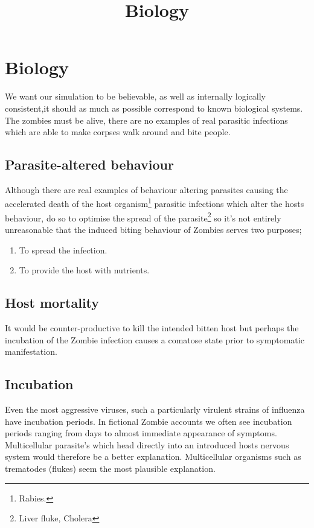 \pagestyle{empty}

\title{Biology}

\section{Biology}
We want our simulation to be believable, as well as internally logically consistent,it should as much as possible correspond to known biological systems. The zombies must be alive, there are no examples of real parasitic infections which are able to make corpses walk around and bite people.

\subsection{Parasite-altered behaviour}
Although there are real examples of behaviour altering parasites causing the accelerated death of the host organism\footnote{Rabies.} parasitic infections which alter the hosts behaviour, do so to optimise the spread of the parasite\footnote{Liver fluke, Cholera} so it's not entirely unreasonable that the induced biting behaviour of Zombies serves two purposes;
\begin{enumerate}
\item To spread the infection.
\item To provide the host with nutrients.
\end{enumerate}

\subsection{Host mortality}
It would be counter-productive to kill the intended bitten host but perhaps the incubation of the Zombie infection causes a comatose state prior to symptomatic manifestation.

\subsection{Incubation}
Even the most aggressive viruses, such a particularly virulent strains of influenza have incubation periods. In fictional Zombie accounts we often see incubation periods ranging from days to almost immediate appearance of symptoms. Multicellular parasite's which head directly into an introduced hosts nervous system would therefore be a better explanation. Multicellular organisms such as trematodes (flukes) seem the most plausible explanation.

